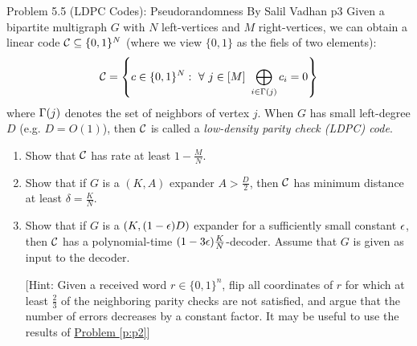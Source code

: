 \documentclass[a4paper, 11pt]{article}
\begin{document}
\begin{problem}{%
		Problem 5.5 (LDPC Codes): Pseudorandomness By Salil Vadhan
	}{p3%
	}
	Given a bipartite multigraph $G$ with $N$ left-vertices and $M$ right-vertices, we can obtain a linear code $\mathcal{C}\subseteq \{0,1\}^N$ (where we view $\{0,1\}$ as the fiels of two elements): $$\mcC=\lt\{c\in \{0,1\}^N:\ \forall\ j\in[M]\ \bigoplus\limits_{i\in \Gm(j)}c_i=0\rt\}$$where $\Gamma (j)$ denotes the set of neighbors of vertex $j$. When $G$ has small left-degree $D$ (e.g. $D=O(1)$), then $\mathcal{C}$ is called a \textit{low-density parity check (LDPC) code}.\begin{enumerate}
		\item Show that $\mathcal{C}$ has rate at least $1-\frac{M}{N}$.
		\item Show that if $G$ is a $(K,A)$ expander $A>\frac{D}2$, then $\mathcal{C}$ has minimum distance at least $\delta=\frac{K}{N}$.
		\item Show that if $G$ is a $(K,(1-\epsilon)D)$ expander for a  sufficiently small constant $\epsilon$, then $\mathcal{C}$ has a polynomial-time $(1-3\epsilon)\frac{K}{N}$-decoder. Assume that $G$ is given as input to the decoder. 
		
		[Hint: Given a received word $r\in\{0,1\}^n$, flip all coordinates of $r$ for which at least $\frac23$ of the neighboring parity checks are not satisfied, and argue that the number of errors decreases by a constant factor. It may be useful to use the results of \hyperref[p:p2]{Problem \ref{p:p2}}]
	\end{enumerate}
\end{problem}
\end{document}
